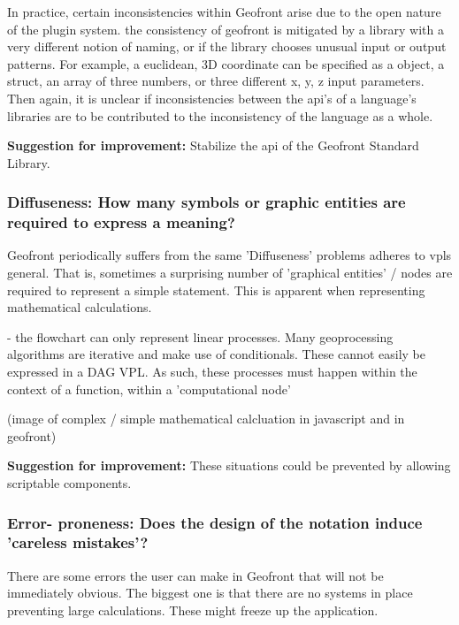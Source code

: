 In practice, certain inconsistencies within Geofront arise due to the open nature of the plugin system. 
the consistency of geofront is mitigated by a library with a very different notion of naming, or if the library chooses unusual input or output patterns. 
For example, a euclidean, 3D coordinate can be specified as a  object, a struct, an array of three numbers, or three different x, y, z input parameters.
Then again, it is unclear if inconsistencies between the api's of a language's libraries are to be contributed to the inconsistency of the language as a whole. 

\textbf{Suggestion for improvement:} Stabilize the api of the Geofront Standard Library.



\subsubsection*{Diffuseness: How many symbols or graphic entities are required to express a meaning?}

Geofront periodically suffers from the same 'Diffuseness' problems \cite[]{green_usability_1996} adheres to vpls general. 
That is, sometimes a surprising number of 'graphical entities' / nodes are required to represent a simple statement.  
This is apparent when representing mathematical calculations. 

\begin{note}
  - the flowchart can only represent linear processes. Many geoprocessing algorithms are iterative and make use of conditionals. These cannot easily be expressed in a DAG VPL. As such, these processes must happen within the context of a function, within a 'computational node'  
\end{note}


(image of complex / simple mathematical calcluation in javascript and in geofront)

\textbf{Suggestion for improvement:} These situations could be prevented by allowing scriptable components. 

\subsubsection*{Error- proneness: Does the design of the notation induce 'careless mistakes'?}

There are some errors the user can make  in Geofront that will not be immediately obvious. 
The biggest one is that there are no systems in place preventing large calculations. 
These might freeze up the application. 

